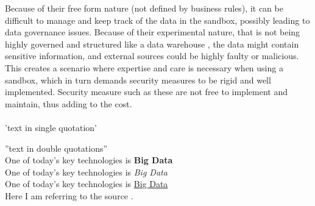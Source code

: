 Because of their free form nature (not defined by business rules), it can be difficult to manage and keep track of the data in the sandbox, possibly leading to data governance issues.
Because of their experimental nature, that is not being highly governed and structured like a data warehouse \cite{l2video}, the data might contain sensitive information, and external sources could be highly faulty or malicious.
This creates a scenario where expertise and care is necessary when using a sandbox, which in turn demands security measures to be rigid and well implemented. Security measure such as these are not free to implement and maintain, thus adding to the cost.
\\\\

\newpage 
'text in single quotation'

''text in double quotations''\\

One of today’s key technologies is \textbf{Big Data}\\
One of today’s key technologies is \textit{Big Data}\\
One of today’s key technologies is \underline{Big Data}\\

Here I am referring to the source \cite{BigData}.